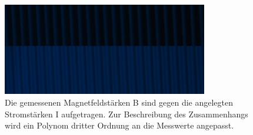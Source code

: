               \FloatBarrier

              \begin{figure}[h]
                \centering
                \includegraphics[width = 0.8\textwidth]{pictures/blau_sigma.jpg}
                \caption{Die gemessenen Magnetfeldstärken B sind gegen die angelegten Stromstärken I aufgetragen. Zur Beschreibung des Zusammenhangs wird ein Polynom dritter Ordnung an die Messwerte angepasst.}
                \label{fig:blau_sigma}
              \end{figure}
          
              \FloatBarrier

